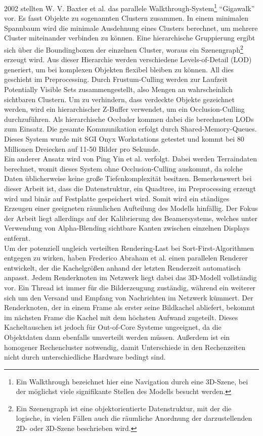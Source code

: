 2002 stellten W. V. Baxter et al. \cite{baxter} das parallele Walkthrough-System\footnote{Ein Walkthrough bezeichnet hier eine Navigation durch eine 3D-Szene, bei der möglichst viele signifikante Stellen des Modells besucht werden.} "`Gigawalk"' vor. Es fasst Objekte zu sogenannten Clustern zusammen. In einem minimalen Spannbaum wird die minimale Ausdehnung eines Clusters berechnet, um mehrere Cluster miteinander verbinden zu können. Eine hierarchische Gruppierung ergibt sich über die Boundingboxen der einzelnen Cluster, woraus ein Szenengraph\footnote{Ein Szenengraph ist eine objektorientierte Datenstruktur, mit der die logische, in vielen Fällen auch die räumliche Anordnung der darzustellenden 2D- oder 3D-Szene beschrieben wird.} erzeugt wird. Aus dieser Hierarchie werden verschiedene Levels-of-Detail (LOD)\cite{hlod} generiert, um bei komplexen Objekten flexibel bleiben zu können. All dies geschieht im Preprocessing. Durch Frustum-Culling werden zur Laufzeit Potentially Visible Sets \cite{RTR3} zusammengestellt, also Mengen an wahrscheinlich sichtbaren Clustern. Um zu verhindern, dass verdeckte Objekte gezeichnet werden, wird ein hierarchischer Z-Buffer verwendet, um ein Occlusion-Culling durchzuführen. Als hierarchische Occluder kommen dabei die berechneten LODs zum Einsatz. Die gesamte Kommunikation erfolgt durch Shared-Memory-Queues. Dieses System wurde mit SGI Onyx Workstations getestet und kommt bei 80 Millionen Dreiecken auf 11-50 Bilder pro Sekunde.\\
Ein anderer Ansatz wird von Ping Yin et al. \cite{DBLP:journals/ijvr/YinJSZ06} verfolgt. Dabei werden Terraindaten berechnet, womit dieses System ohne Occlusion-Culling auskommt, da solche Daten üblicherweise keine große Tiefenkomplexität besitzen. Bemerkenswert bei dieser Arbeit ist, dass die Datenstruktur, ein Quadtree, im Preprocessing erzeugt wird und binär auf Festplatte gespeichert wird. Somit wird ein ständiges Erzeugen einer geeigneten räumlichen Aufteilung des Modells hinfällig. Der Fokus der Arbeit liegt allerdings auf der Kalibrierung des Beamersystems, welches unter Verwendung von Alpha-Blending sichtbare Kanten zwischen einzelnen Displays entfernt.\\
Um der potenziell ungleich verteilten Rendering-Last bei Sort-First-Algorithmen entgegen zu wirken, haben Frederico Abraham et al. \cite{abraham} einen parallelen Renderer entwickelt, der die Kachelgrößen anhand der letzten Renderzeit automatisch anpasst. Jedem Renderknoten im Netzwerk liegt dabei das 3D-Modell vollständig vor. Ein Thread ist immer für die Bilderzeugung zuständig, während ein weiterer sich um den Versand und Empfang von Nachrichten im Netzwerk kümmert. Der Renderknoten, der in einem Frame als erster seine Bildkachel abliefert, bekommt im nächsten Frame die Kachel mit dem höchsten Aufwand zugeteilt. Dieses Kacheltauschen ist jedoch für Out-of-Core Systeme ungeeignet, da die Objektdaten dann ebenfalls umverteilt werden müssen. Außerdem ist ein homogener Rechencluster notwendig, damit Unterschiede in den Rechenzeiten nicht durch unterschiedliche Hardware bedingt sind.

